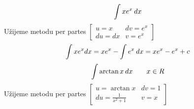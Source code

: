  \begin{example}\label{mai:exam016}
    \begin{equation}\label{mai:exam016_001}
      \int{xe^x\hspace{2pt}dx}
    \end{equation}
    Užijeme metodu per partes 
      \(\left[\begin{array}{cc}
              u=x   & dv=e^x \\
              du=dx & v=e^x
        \end{array}\right]\) 
    \begin{equation*}
      \int{xe^xdx} = xe^x-\int{e^x\hspace{2pt}dx} = xe^x - e^x+ c
    \end{equation*}
    \begin{equation}\label{mai:exam016_002}
      \int{\arctan x\hspace{2pt}dx}\qquad x\in R
    \end{equation}
    Užijeme metodu per partes 
       \(\left[\begin{array}{cc} 
                u =\arctan x                     &  dv= 1  \\ 
               du =\displaystyle\frac{1}{x^2+1}  &   v= x
             \end{array}
       \right]\)
       

\end{example}
